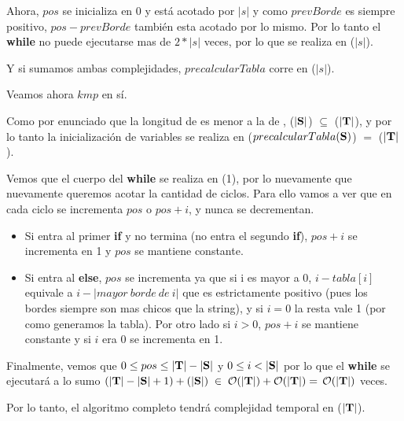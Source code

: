 \begin{algorithmic}
Ahora, $pos$ se inicializa en $0$ y está acotado por $|s|$ y como $prevBorde$ es siempre positivo, $pos - prevBorde$ también esta acotado por lo mismo. Por lo tanto el \textbf{while} no puede ejecutarse mas de $2 * |s|$ veces, por lo que se realiza en \bigo($|s|$).

Y si sumamos ambas complejidades, $precalcularTabla$ corre en \bigo($|s|$).

\vspace{1em}

Veamos ahora $kmp$ en sí.

Como por enunciado que la longitud de \sS es menor a la de \sT, \bigo($|\textbf{S}|$) $\subseteq$ \bigo($|\textbf{T}|$), y por lo tanto la inicialización de variables se realiza en \bigo($precalcularTabla(\textbf{S})$) $=$ \bigo($|\textbf{T}|$).

Vemos que el cuerpo del \textbf{while} se realiza en \bigo(1), por lo nuevamente que nuevamente queremos acotar la cantidad de ciclos. Para ello vamos a ver que en cada ciclo se incrementa $pos$ o $pos + i$, y nunca se decrementan.

\begin{itemize}
    \item Si entra al primer \textbf{if} y no termina (no entra el segundo \textbf{if}), $pos + i$ se incrementa en 1 y $pos$ se mantiene constante.
    \item Si entra al \textbf{else}, $pos$ se incrementa ya que si i es mayor a 0, $i - tabla[i]$ equivale a $i - |mayor\ borde\ de\ i|$ que es estrictamente positivo (pues los bordes siempre son mas chicos que la string), y si $i=0$ la resta vale 1 (por como generamos la tabla). Por otro lado si $i>0$, $pos + i$ se mantiene constante y si $i$ era 0 se incrementa en 1.
\end{itemize}

Finalmente, vemos que $0 \leq pos \leq |\textbf{T}| - |\textbf{S}|$ y $0 \leq i < |\textbf{S}|$ por lo que el \textbf{while} se ejecutará a lo sumo $(|\textbf{T}| - |\textbf{S}| + 1) + (|\textbf{S}|) \;\in\; \mathcal{O}(|\textbf{T}|) + \mathcal{O}(|\textbf{T}|) = \,\mathcal{O}(|\textbf{T}|)$ veces.

Por lo tanto, el algoritmo completo tendrá complejidad temporal en \bigo($|\textbf{T}|$).

\end{algorithmic}

